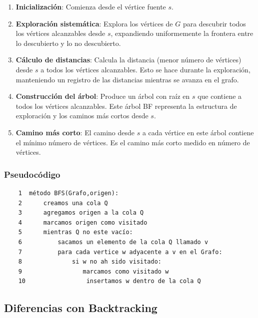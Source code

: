 \begin{enumerate}
    \item \textbf{Inicialización}: Comienza desde el vértice fuente $s$.
    \item \textbf{Exploración sistemática}: Explora los vértices de $G$ para descubrir todos los vértices alcanzables desde $s$, expandiendo uniformemente la frontera entre lo descubierto y lo no descubierto.
    \item \textbf{Cálculo de distancias}: Calcula la distancia (menor número de vértices) desde $s$ a todos los vértices alcanzables. Esto se hace durante la exploración, manteniendo un registro de las distancias mientras se avanza en el grafo.
    \item \textbf{Construcción del árbol}: Produce un árbol con raíz en $s$ que contiene a todos los vértices alcanzables. Este árbol BF representa la estructura de exploración y los caminos más cortos desde $s$.
    \item \textbf{Camino más corto}: El camino desde $s$ a cada vértice en este árbol contiene el mínimo número de vértices. Es el camino más corto medido en número de vértices.
\end{enumerate}

\subsubsection*{Pseudocódigo \cite{bfsps}}

\begin{verbatim}
    1  método BFS(Grafo,origen):
    2      creamos una cola Q
    3      agregamos origen a la cola Q
    4      marcamos origen como visitado
    5      mientras Q no este vacío:
    6          sacamos un elemento de la cola Q llamado v
    7          para cada vertice w adyacente a v en el Grafo: 
    8              si w no ah sido visitado:
    9                 marcamos como visitado w
    10                 insertamos w dentro de la cola Q
\end{verbatim}


\subsection*{Diferencias con Backtracking}


